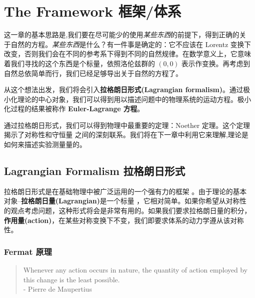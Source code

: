 
\newcommand\rd{\mathrm d}

\chapter[框架/体系]{The Framework 框架/体系}\label{chap4}
这一章的基本思路是,我们要在尽可能少的使用{\it 某些东西}的前提下，得到正确的关于自然的方程。{\it 某些东西}是什么？有一件事是确定的：它不应该在 Lorentz 变换下改变，否则我们会在不同的参考系下得到不同的自然规律。在数学意义上，它意味着我们寻找的这个东西是个标量，依照洛伦兹群的 \( (0,0) \) 表示作变换。再考虑到自然总依简单而行，我们已经足够导出关于自然的方程了。

从这个想法出发，我们将会引入{\bf 拉格朗日形式(Lagrangian formalism)}。通过极小化理论的中心对象，我们可以得到用以描述问题中的物理系统的运动方程。极小化过程的结果被称作 {\bf Euler-Lagrange 方程}。

通过拉格朗日形式，我们可以得到物理中最重要的定理：Noether 定理。这个定理揭示了对称性和守恒量%
%
之间的深刻联系。我们将在下一章中利用它来理解,理论是如何来描述实验测量量的。

\section[拉格朗日形式]{Lagrangian Formalism 拉格朗日形式}\label{sec4.1}

拉格朗日形式是在基础物理中被广泛运用的一个强有力的框架%
%
。由于理论的基本对象--{\bf 拉格朗日量(Lagrangian)}是一个标量%
%
，它相对简单。如果你希望从对称性的观点考虑问题，这种形式将会是非常有用的。如果我们要求拉格朗日量的积分，{\bf 作用量(action)}，在某些对称变换下不变，我们即要求体系的动力学遵从该对称性。

\subsection{Fermat 原理}\label{sec4.1.1}
\begin{quote}
Whenever any action occurs in nature, the quantity of action employed by this change is the least possible.\\
- Pierre de Maupertius 
\end{quote}

